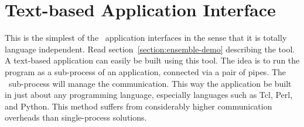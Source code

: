 \section{Text-based Application Interface}

This is the simplest of the \ensemble\ application interfaces in the
sense that it is totally language independent.  Read
section~\ref{section:ensemble-demo} describing the
 tool.  A text-based application can easily be
built using this tool.  The idea is to run the 
program as a sub-process of an application, connected via a pair of
pipes.  The \ensemble\ sub-process will manage the communication.
This way the application be built in just about any programming
language, especially languages such as Tcl, Perl, and Python.  This
method suffers from considerably higher communication overheads than
single-process solutions.
